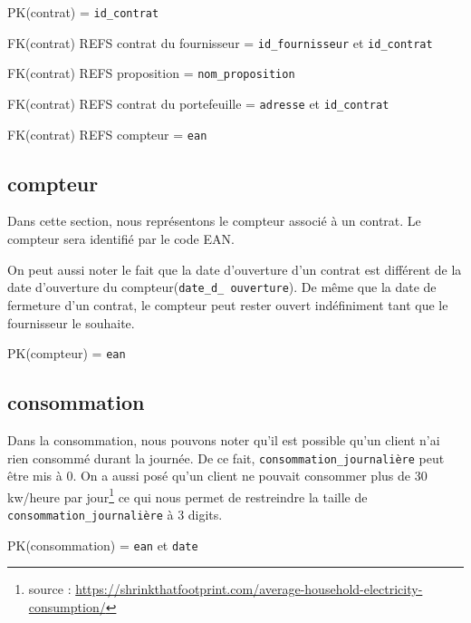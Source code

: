 \begin{flushleft}
PK(contrat) = \texttt{id\_contrat}
\end{flushleft}

\begin{flushleft}
FK(contrat) REFS contrat du fournisseur = \texttt{id\_fournisseur} et \texttt{id\_contrat}

FK(contrat) REFS proposition = \texttt{nom\_proposition}

FK(contrat) REFS contrat du portefeuille = \texttt{adresse} et \texttt{id\_contrat}

FK(contrat) REFS compteur = \texttt{ean}
\end{flushleft}
\newpage
\subsection{compteur}
\begin{flushleft}
Dans cette section, nous représentons le compteur associé à un contrat. Le compteur sera identifié par le code EAN. 
\end{flushleft}

\begin{flushleft}
On peut aussi noter le fait que la date d'ouverture d'un contrat est différent de la date d'ouverture du compteur(\texttt{date\_d\_ ouverture}).
De même que la date de fermeture d'un contrat, le compteur peut rester ouvert indéfiniment tant que le fournisseur le souhaite.
\end{flushleft}

\begin{flushleft}
PK(compteur) = \texttt{ean}
\end{flushleft}
\subsection{consommation}
\begin{flushleft}
Dans la consommation, nous pouvons noter qu'il est possible qu'un client n'ai rien consommé durant la journée. De ce fait, \texttt{consommation\_journalière} peut être mis à 0. On a aussi posé qu'un
client ne pouvait consommer plus de 30 kw/heure par jour\footnote{source : \url{https://shrinkthatfootprint.com/average-household-electricity-consumption/}} ce qui nous permet de restreindre la taille de \texttt{consommation\_journalière} à 3 digits.
\end{flushleft}

\begin{flushleft}
PK(consommation) = \texttt{ean} et \texttt{date}
\end{flushleft}

